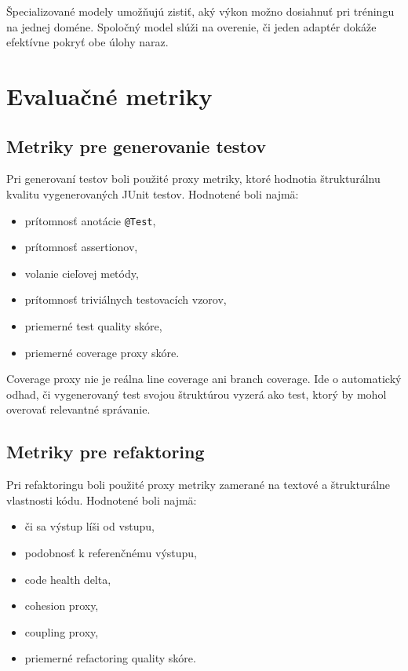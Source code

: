 \documentclass[11pt,a4paper]{article}
\begin{document}
Špecializované modely umožňujú zistiť, aký výkon možno dosiahnuť pri tréningu na jednej doméne. Spoločný model slúži na overenie, či jeden adaptér dokáže efektívne pokryť obe úlohy naraz.

\section{Evaluačné metriky}

\subsection{Metriky pre generovanie testov}

Pri generovaní testov boli použité proxy metriky, ktoré hodnotia štrukturálnu kvalitu vygenerovaných JUnit testov. Hodnotené boli najmä:
\begin{itemize}
\item prítomnosť anotácie \texttt{@Test},
\item prítomnosť assertionov,
\item volanie cieľovej metódy,
\item prítomnosť triviálnych testovacích vzorov,
\item priemerné test quality skóre,
\item priemerné coverage proxy skóre.
\end{itemize}

Coverage proxy nie je reálna line coverage ani branch coverage. Ide o automatický odhad, či vygenerovaný test svojou štruktúrou vyzerá ako test, ktorý by mohol overovať relevantné správanie.

\subsection{Metriky pre refaktoring}

Pri refaktoringu boli použité proxy metriky zamerané na textové a štrukturálne vlastnosti kódu. Hodnotené boli najmä:
\begin{itemize}
\item či sa výstup líši od vstupu,
\item podobnosť k referenčnému výstupu,
\item code health delta,
\item cohesion proxy,
\item coupling proxy,
\item priemerné refactoring quality skóre.
\end{itemize}
\end{document}
